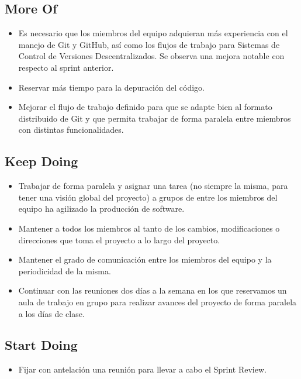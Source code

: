 \documentclass{article}
\begin{document}
\subsection{More Of}
\begin{itemize}
\item Es necesario que los miembros del equipo adquieran más experiencia con el manejo de Git y GitHub, así como los flujos de trabajo para Sistemas de Control de Versiones Descentralizados. Se observa una mejora notable con respecto al sprint anterior.

\item Reservar más tiempo para la depuración del código.

\item Mejorar el flujo de trabajo definido para que se adapte bien al formato distribuido de Git y que permita trabajar de forma paralela entre miembros con distintas funcionalidades.

\end{itemize}
\subsection{Keep Doing}
\begin{itemize}
\item Trabajar de forma paralela y asignar una tarea (no siempre la misma, para tener una visión global del proyecto) a grupos de entre los miembros del equipo ha agilizado la producción de software.

\item Mantener a todos los miembros al tanto de los cambios, modificaciones o direcciones que toma el proyecto a lo largo del proyecto.

\item Mantener el grado de comunicación entre los miembros del equipo y la periodicidad de la misma.

\item Continuar con las reuniones dos días a la semana en los que reservamos un aula de trabajo en grupo para realizar avances del proyecto de forma paralela a los días de clase.

\end{itemize}



\subsection{Start Doing}
\begin{itemize}
\item Fijar con antelación una reunión para llevar a cabo el Sprint Review.

\end{itemize}
\end{document}

